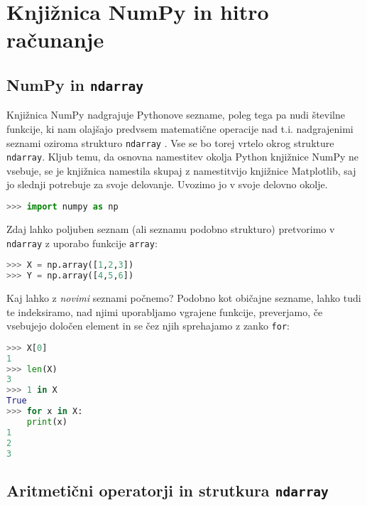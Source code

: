 \chapter{Knjižnica NumPy in hitro računanje}

\section{NumPy in \texttt{ndarray}}

Knjižnica NumPy nadgrajuje Pythonove sezname, poleg tega pa nudi številne funkcije, ki nam olajšajo predvsem matematične operacije nad t.i. nadgrajenimi seznami oziroma strukturo \texttt{ndarray} . Vse se bo torej vrtelo okrog strukture \texttt{ndarray}. Kljub temu, da osnovna namestitev okolja Python knjižnice NumPy ne vsebuje, se je knjižnica namestila skupaj z namestitvijo knjižnice Matplotlib, saj jo slednji potrebuje za svoje delovanje. Uvozimo jo v svoje delovno okolje.
\begin{lstlisting}[language=Python]
>>> import numpy as np
\end{lstlisting}
Zdaj lahko poljuben seznam (ali seznamu podobno strukturo) pretvorimo v \texttt{ndarray} z uporabo funkcije \texttt{array}:
\begin{lstlisting}[language=Python]
>>> X = np.array([1,2,3])
>>> Y = np.array([4,5,6])
\end{lstlisting}
Kaj lahko z \emph{novimi} seznami počnemo? Podobno kot običajne sezname, lahko tudi te indeksiramo, nad njimi uporabljamo vgrajene funkcije, preverjamo, če vsebujejo določen element in se čez njih sprehajamo z zanko \texttt{for}:
\begin{lstlisting}[language=Python]
>>> X[0]
1
>>> len(X)
3
>>> 1 in X
True
>>> for x in X:
	print(x)
1
2
3
\end{lstlisting}

\section{Aritmetični operatorji in strutkura \texttt{ndarray}}

